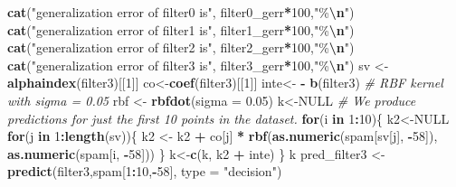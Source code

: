 \documentclass[
]{article}
\newenvironment{Shaded}{\begin{snugshade}}{\end{snugshade}}
\newcommand{\AttributeTok}[1]{\textcolor[rgb]{0.13,0.29,0.53}{#1}}
\newcommand{\CommentTok}[1]{\textcolor[rgb]{0.56,0.35,0.01}{\textit{#1}}}
\newcommand{\ConstantTok}[1]{\textcolor[rgb]{0.56,0.35,0.01}{#1}}
\newcommand{\ControlFlowTok}[1]{\textcolor[rgb]{0.13,0.29,0.53}{\textbf{#1}}}
\newcommand{\DecValTok}[1]{\textcolor[rgb]{0.00,0.00,0.81}{#1}}
\newcommand{\FloatTok}[1]{\textcolor[rgb]{0.00,0.00,0.81}{#1}}
\newcommand{\FunctionTok}[1]{\textcolor[rgb]{0.13,0.29,0.53}{\textbf{#1}}}
\newcommand{\NormalTok}[1]{#1}
\newcommand{\OtherTok}[1]{\textcolor[rgb]{0.56,0.35,0.01}{#1}}
\newcommand{\SpecialCharTok}[1]{\textcolor[rgb]{0.81,0.36,0.00}{\textbf{#1}}}
\newcommand{\StringTok}[1]{\textcolor[rgb]{0.31,0.60,0.02}{#1}}
\begin{document}
\begin{Shaded}
\begin{Highlighting}[]
\FunctionTok{cat}\NormalTok{(}\StringTok{"generalization error of filter0 is"}\NormalTok{, filter0\_gerr}\SpecialCharTok{*}\DecValTok{100}\NormalTok{,}\StringTok{"\%}\SpecialCharTok{\textbackslash{}n}\StringTok{"}\NormalTok{)}
\FunctionTok{cat}\NormalTok{(}\StringTok{"generalization error of filter1 is"}\NormalTok{, filter1\_gerr}\SpecialCharTok{*}\DecValTok{100}\NormalTok{,}\StringTok{"\%}\SpecialCharTok{\textbackslash{}n}\StringTok{"}\NormalTok{)}
\FunctionTok{cat}\NormalTok{(}\StringTok{"generalization error of filter2 is"}\NormalTok{, filter2\_gerr}\SpecialCharTok{*}\DecValTok{100}\NormalTok{,}\StringTok{"\%}\SpecialCharTok{\textbackslash{}n}\StringTok{"}\NormalTok{)}
\FunctionTok{cat}\NormalTok{(}\StringTok{"generalization error of filter3 is"}\NormalTok{, filter3\_gerr}\SpecialCharTok{*}\DecValTok{100}\NormalTok{,}\StringTok{"\%}\SpecialCharTok{\textbackslash{}n}\StringTok{"}\NormalTok{)}
\NormalTok{sv }\OtherTok{\textless{}{-}} \FunctionTok{alphaindex}\NormalTok{(filter3)[[}\DecValTok{1}\NormalTok{]]}
\NormalTok{co}\OtherTok{\textless{}{-}}\FunctionTok{coef}\NormalTok{(filter3)[[}\DecValTok{1}\NormalTok{]]}
\NormalTok{inte}\OtherTok{\textless{}{-}} \SpecialCharTok{{-}} \FunctionTok{b}\NormalTok{(filter3)}
\CommentTok{\# RBF kernel with sigma = 0.05}
\NormalTok{rbf }\OtherTok{\textless{}{-}} \FunctionTok{rbfdot}\NormalTok{(}\AttributeTok{sigma =} \FloatTok{0.05}\NormalTok{) }
\NormalTok{k}\OtherTok{\textless{}{-}}\ConstantTok{NULL}
\CommentTok{\# We produce predictions for just the first 10 points in the dataset.}
\ControlFlowTok{for}\NormalTok{(i }\ControlFlowTok{in} \DecValTok{1}\SpecialCharTok{:}\DecValTok{10}\NormalTok{)\{ }
\NormalTok{  k2}\OtherTok{\textless{}{-}}\ConstantTok{NULL}
  \ControlFlowTok{for}\NormalTok{(j }\ControlFlowTok{in} \DecValTok{1}\SpecialCharTok{:}\FunctionTok{length}\NormalTok{(sv))\{}
\NormalTok{    k2 }\OtherTok{\textless{}{-}}\NormalTok{ k2 }\SpecialCharTok{+}\NormalTok{ co[j] }\SpecialCharTok{*} \FunctionTok{rbf}\NormalTok{(}\FunctionTok{as.numeric}\NormalTok{(spam[sv[j], }\SpecialCharTok{{-}}\DecValTok{58}\NormalTok{]),}
                           \FunctionTok{as.numeric}\NormalTok{(spam[i, }\SpecialCharTok{{-}}\DecValTok{58}\NormalTok{]))}
\NormalTok{  \}}
\NormalTok{  k}\OtherTok{\textless{}{-}}\FunctionTok{c}\NormalTok{(k,  k2 }\SpecialCharTok{+}\NormalTok{ inte)}
\NormalTok{\}}
\NormalTok{k}
\NormalTok{pred\_filter3 }\OtherTok{\textless{}{-}} \FunctionTok{predict}\NormalTok{(filter3,spam[}\DecValTok{1}\SpecialCharTok{:}\DecValTok{10}\NormalTok{,}\SpecialCharTok{{-}}\DecValTok{58}\NormalTok{], }\AttributeTok{type =} \StringTok{"decision"}\NormalTok{)}

\end{Highlighting}
\end{Shaded}
\end{document}
